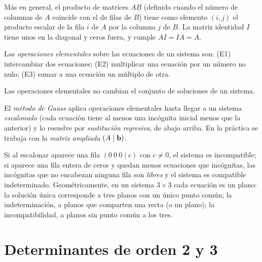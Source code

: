 Más en general, el producto de matrices $AB$ (definido cuando el número de columnas de $A$ coincide con el de filas de $B$) tiene como elemento $(i,j)$ el producto escalar de la fila $i$ de $A$ por la columna $j$ de $B$. La matriz identidad $I$ tiene unos en la diagonal y ceros fuera, y cumple $AI=IA=A$.

\begin{definicion}\label{def:elementales}
Las \emph{operaciones elementales} sobre las ecuaciones de un sistema son: (E1) intercambiar dos ecuaciones; (E2) multiplicar una ecuación por un número no nulo; (E3) sumar a una ecuación un múltiplo de otra.
\end{definicion}

\begin{proposicion}\label{prop:elementales}
Las operaciones elementales no cambian el conjunto de soluciones de un sistema.
\end{proposicion}

El \emph{método de Gauss} aplica operaciones elementales hasta llegar a un sistema \emph{escalonado} (cada ecuación tiene al menos una incógnita inicial menos que la anterior) y lo resuelve por \emph{sustitución regresiva}, de abajo arriba. En la práctica se trabaja con la \emph{matriz ampliada} $(A\mid\mathbf{b})$.

\addtocounter{definicion}{1}%

Si al escalonar aparece una fila $(0\ 0\ 0\mid c)$ con $c\neq0$, el sistema es incompatible; si aparece una fila entera de ceros y quedan menos ecuaciones que incógnitas, las incógnitas que no encabezan ninguna fila son \emph{libres} y el sistema es compatible indeterminado. Geométricamente, en un sistema $3\times3$ cada ecuación es un plano: la solución única corresponde a tres planos con un único punto común; la indeterminación, a planos que comparten una recta (o un plano); la incompatibilidad, a planos sin punto común a los tres.

\section{Determinantes de orden 2 y 3}

